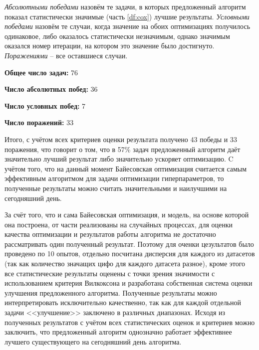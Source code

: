 \documentclass[times,specification,annotation]{itmo-student-thesis}
\begin{document}
	\textit{Абсолютными победами} назовём те задачи, в которых предложенный алгоритм показал статистически значимые (часть \ref{df:cox}) лучшие результаты. \textit{Условными победами} назовём те случаи, когда значение на обоих оптимизациях получилось одинаковое, либо оказалось статистически незначимым, однако значимым оказался номер итерации, на котором это значение было достигнуто. \textit{Поражениями} -- все оставшиеся случаи.
	\par
	
	\textbf{Общее число задач:} 76 \par
	\textbf{Число абсолютных побед:} 36 \par
	\textbf{Число условных побед:} 7 \par
	\textbf{Число поражений:} 33 \par
	
	Итого, с учётом всех критериев оценки результата получено 43 победы и 33 поражения, что говорит о том, что в 57\% задач предложенный алгоритм даёт значительно лучший результат либо значительно ускоряет оптимизацию. C учётом того, что на данный момент Байесовская оптимизация считается самым эффективным алгоритмом для задачи оптимизации гиперпараметров, то полученные результаты можно считать значительными и наилучшими на сегодняшний день.	

	\chapterconclusion
	За счёт того, что и сама Байесовская оптимизация, и модель, на основе которой она построена, от части реализованы на случайных процессах, для оценки качества оптимизации и результатов работы алгоритма не достаточно рассматривать один полученный результат. Поэтому для оченки цезультатов было проведено по 10 опытов, отдельно посчитана дисперсия для каждого из датасетов (так как количество значащих цифо для каждого датасета разное), кроме этого все статистические результаты оценены с точки зрения значимости с использованием критерия Вилкоксона и разработана собственная система оценки улучшения предложенного алгоритма. Полученные результаты можно интерпретировать исключительно качественно, так как для каждой отдельной задачи <<улучшение>> заключено в различных диапазонах. Исходя из полученных результатов с учётом всех статистических оценок и критериев можно заключить, что предложенный алгоритм однозначно работает эффективнее лучшего существующего на сегодняшний день алгоритма.
	
\end{document}
